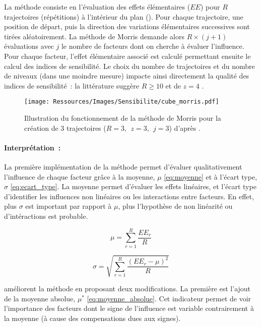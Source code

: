 La méthode consiste en l’évaluation des effets élémentaires ($EE$) pour $R$ trajectoires
(répétitions) à l’intérieur du plan  ().
Pour chaque trajectoire, une position de départ, puis la direction des variations
élémentaires successives sont tirées aléatoirement. La méthode de Morris demande alors $R
\times (j + 1)$ évaluations avec $j$ le nombre de facteurs dont on cherche à évaluer
l’influence. Pour chaque facteur, l’effet élémentaire associé est calculé permettant ensuite
le calcul des indices de sensibilité. Le choix du nombre de trajectoires et du nombre de
niveaux (dans une moindre mesure) impacte ainsi directement la qualité des indices de
sensibilité~: la littérature suggère $R \geq 10$ et de $z = 4$ \parencite{Campolongo20071509}.

\begin{figure}
    \centering
    \texttt{[image: Ressources/Images/Sensibilite/cube\_morris.pdf]}
    \caption[Illustration du fonctionnement de la méthode de Morris]
            {Illustration du fonctionnement de la méthode de Morris pour la création
             de 3 trajectoires ($R = 3,~~ z = 3,~~ j = 3$) d’après \textcite{Munaretto2014}.}
    \label{fig:fonctionnement_morris}
\end{figure}

\paragraph{Interprétation~:} %
\label{par:interpretation}
La première implémentation de la méthode permet d’évaluer qualitativement l’influence de
chaque facteur grâce à la moyenne, $\mu$ \eqref{eq:moyenne} et à l’écart type, $\sigma$
\eqref{eq:ecart_type}. La moyenne permet d’évaluer les effets linéaires, et l’écart type
d’identifier les influences non linéaires ou les interactions entre facteurs.
En effet, plus $\sigma$ est important par rapport à $\mu$, plus l’hypothèse de non linéarité
ou d’intéractions est probable.

\begin{equation}\label{eq:moyenne}
    \mu = \sum_{r = 1}^{R} \frac{EE_{r}}{R}
\end{equation}

\begin{equation}\label{eq:ecart_type}
    \sigma = \sqrt{\sum_{r=1}^{R}\frac{(EE_{r} - \mu)^{2}}{R}}
\end{equation}

\textcite{Campolongo20071509} améliorent la méthode en proposant deux modifications. La première
est l’ajout de la moyenne absolue, $\mu^{*}$ \eqref{eq:moyenne_absolue}. Cet indicateur permet
de voir l’importance des facteurs dont le signe de l’influence est variable contrairement à
la moyenne (à cause des compensations dues aux signes).

